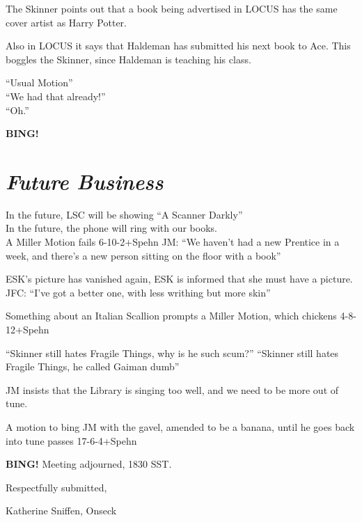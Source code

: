 \documentclass[10pt]{article}
\newcommand{\bing}{{\bf BING!} }
\newcommand{\goto}[1]{\bing \vskip 12pt \section*{{\em{#1}}}}
\begin{document}
The Skinner points out that a book being advertised in LOCUS has the
same cover artist as Harry Potter.

Also in LOCUS it says that Haldeman has submitted his next book to
Ace.  This boggles the Skinner, since Haldeman is teaching his class.

``Usual Motion''\\
``We had that already!''\\
``Oh.''

\goto{Future Business}
In the future, LSC will be showing ``A Scanner Darkly''\\
In the future, the phone will ring with our books.\\

A Miller Motion fails 6-10-2+Spehn
JM: ``We haven't had a new Prentice in a week, and there's a new
person sitting on the floor with a book''

ESK's picture has vanished again,
ESK is informed that she must have a picture. 
JFC: ``I've got a better one, with less writhing but more skin'' 

Something about an Italian Scallion prompts a  Miller Motion, which
chickens 4-8-12+Spehn


``Skinner still hates Fragile Things, why is he such scum?''
``Skinner still hates Fragile Things, he called Gaiman dumb''

JM insists that the Library is singing too well, and we need to be
more out of tune.

A motion to bing JM with the gavel, amended to be a banana,  until he goes back into tune
passes 17-6-4+Spehn

\bing
\noindent
Meeting adjourned, 1830 SST.

\vspace{18pt}

\centerline{Respectfully submitted,}
\centerline{Katherine Sniffen, Onseck}
\end{document}
